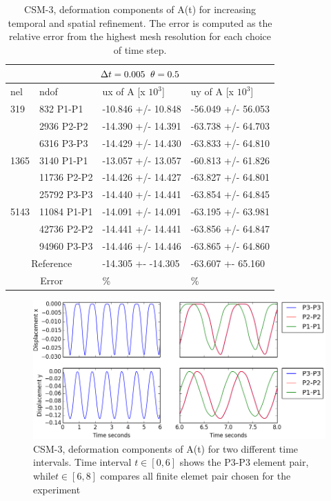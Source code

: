 \begin{table}[h!]
\centering
\label{CSM 3 Results 3}
\begin{tabular}{ |p{1cm}||p{2.7cm}|p{3.3cm}|p{3.3cm}|}
\hline
  \multicolumn{4}{|c|}{$\Delta t = 0.005 \hspace{2mm} \theta = 0.5$} \\
\hline
nel & ndof & ux of A [x $10^{3}$]  &uy of A [x $10^{3}$] \\
\hline
    319     & 832 P1-P1 & -10.846       +/-  10.848 & -56.049       +/-  56.053 \\
     & 2936 P2-P2  & -14.390       +/-  14.391 & -63.738       +/-  64.703 \\
      & 6316 P3-P3 & -14.429       +/-  14.430 & -63.833       +/-  64.810 \\
 \hline 
    1365    & 3140 P1-P1 & -13.057       +/-  13.057 & -60.813       +/-  61.826 \\
     & 11736 P2-P2& -14.426       +/-  14.427 & -63.827       +/-  64.801 \\
     & 25792 P3-P3 & -14.440       +/-  14.441 & -63.854       +/-  64.845 \\
 \hline
      5143    & 11084 P1-P1 & -14.091       +/-  14.091 & -63.195       +/-  63.981 \\
     & 42736 P2-P2 & -14.441       +/-  14.441 & -63.856       +/-  64.847 \\
     & 94960 P3-P3 & -14.446       +/-  14.446 & -63.865       +/-  64.860 \\
 \hline
  \multicolumn{2}{|c|}{Reference}  &-14.305 +- -14.305        & -63.607 +- 65.160    \\
   \hline
    \multicolumn{2}{|c|}{Error}  & \%   &  \%\\
   \hline
\end{tabular}
\caption{CSM-3, deformation components of A(t) for  increasing temporal and spatial refinement. The error is computed as the relative error from the highest mesh resolution for each choice of time step.}
\end{table}

\begin{figure}[h!]
  \centering
    \includegraphics[scale=0.6]{./Fig/csm3compare.png}
      \caption{CSM-3, deformation components of A(t) for two different time intervals. Time interval $t \in [0, 6]$ shows the P3-P3 element pair, while$t \in [6, 8]$ compares all finite elemet pair chosen for the experiment}
\end{figure}

